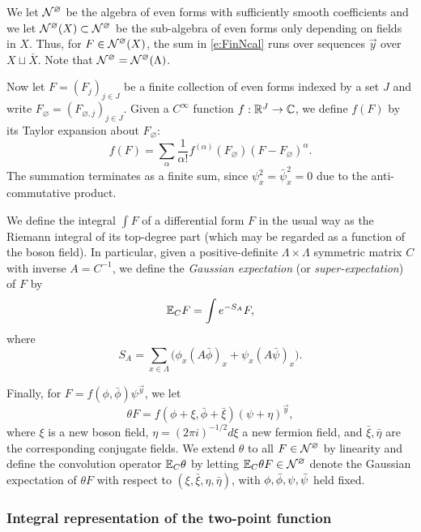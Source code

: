 We let $\mathcal{N}^\varnothing$ be the algebra of even forms with sufficiently smooth coefficients
and we let $\mathcal{N}^\varnothing(X) \subset \mathcal{N}^\varnothing$ be the sub-algebra of even forms only depending on fields
in $X$. Thus, for $F \in \mathcal{N}^\varnothing(X)$, the sum in \eqref{e:FinNcal} runs over sequences $\vec y$
over $X \sqcup \bar X$.
Note that $\mathcal{N}^\varnothing = \mathcal{N}^\varnothing(\Lambda)$.


Now let $F = (F_j)_{j \in J}$ be a finite collection of even forms
indexed by a set $J$
and write $F_\varnothing = (F_{\varnothing,j})_{j \in J}$.
Given a $C^\infty$ function $f : {\mathbb R}^J \rightarrow \mathbb{C}$, we define
$f(F)$ by its Taylor expansion about $F_\varnothing$:
\begin{equation}
f(F) = \sum_\alpha \frac{1}{\alpha!} f^{(\alpha)}(F_\varnothing) (F - F_\varnothing)^\alpha.
\end{equation}
The summation terminates as a finite sum,
since $\psi_x^2 = \bar\psi_x^2 = 0$ due to the anti-commut\-ative product.

We define the integral
$\int F$
of a differential form $F$ in the usual way
as the Riemann integral of its top-degree part
(which may be regarded as a function
of the boson field).
In particular, given a positive-definite
$\Lambda \times \Lambda$ symmetric matrix $C$
with inverse $A = C^{-1}$,
we define the \emph{Gaussian expectation}
(or \emph{super-expectation}) of $F$ by
\begin{equation}
\lbeq{ExCF}
\Ex_C F = \int e^{-S_A} F,
\end{equation}
where
\begin{equation}
\label{e:action}
S_A = \sum_{x\in\Lambda} \Big(\phi_x (A\bar\phi)_x + \psi_x (A \bar\psi)_x\Big).
\end{equation}

Finally, for $F = f(\phi, \bar\phi) \psi^{\vec y}$,
we let
\begin{equation}
\theta F = f(\phi + \xi, \bar\phi + \bar\xi) (\psi + \eta)^{\vec y},
\end{equation}
where $\xi$ is a new boson field, $\eta = (2\pi i)^{-1/2} d\xi$ a new fermion field,
and $\bar\xi, \bar\eta$ are the corresponding conjugate fields.
We extend $\theta$ to all $F \in \mathcal{N}^\varnothing$ by linearity
and define the convolution operator $\mathbb{E}_C\theta$ by letting
$\mathbb{E}_C\theta F \in \mathcal{N}^\varnothing$ denote the Gaussian expectation of $\theta F$ with respect
to $(\xi, \bar\xi, \eta, \bar\eta)$, with $\phi,\bar\phi,\psi,\bar\psi$ held fixed.

\subsubsection{Integral representation of the two-point function}
\label{sec:Gintrep}

